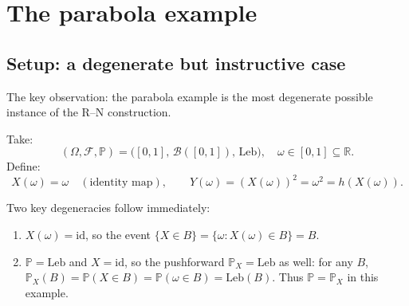 \documentclass[12pt, a4paper]{article}
\theoremstyle{definition}
\newcommand{\R}{\mathbb{R}}
\newcommand{\Prob}{\mathbb{P}}
\newcommand{\borel}{\mathcal{B}}
\newcommand{\sF}{\mathcal{F}}
\newcommand{\Leb}{\mathrm{Leb}}
\begin{document}
\section{The parabola example}
\label{sec:parabola}

\subsection{Setup: a degenerate but instructive case }

The key observation: the parabola example is the most degenerate
possible instance of the R--N construction.

Take:
\[
  (\Omega,\sF,\Prob) = \bigl([0,1],\,\borel([0,1]),\,\Leb\bigr),
  \quad \omega\in[0,1]\subseteq\R.
\]
Define:
\[
  X(\omega) = \omega \quad (\text{identity map}),
  \qquad
  Y(\omega) = (X(\omega))^2 = \omega^2 = h(X(\omega)).
\]

Two key degeneracies follow immediately:

\begin{enumerate}[label=(\arabic*)]
  \item $X(\omega)=\mathrm{id}$, so the event
    $\{X\in B\}=\{\omega:X(\omega)\in B\}=B$.

  \item $\Prob=\Leb$ and $X=\mathrm{id}$, so the pushforward
    $\Prob_X=\Leb$ as well: for any $B$,
    $\Prob_X(B)=\Prob(X\in B)=\Prob(\omega\in B)=\Leb(B)$.
    Thus $\Prob=\Prob_X$ in this example.
\end{enumerate}

\begin{center}
\end{center}
\end{document}
